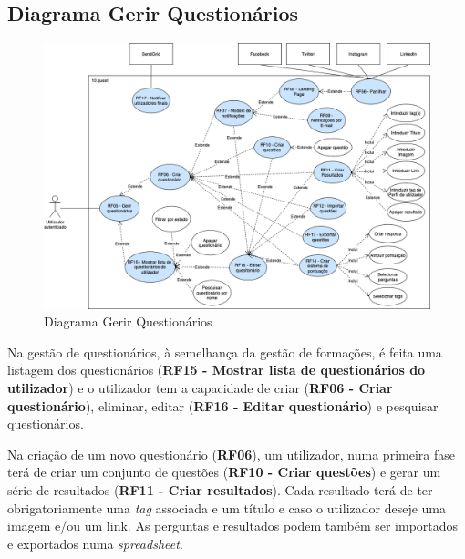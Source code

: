 \subsection{Diagrama Gerir Questionários}
\label{d:quests}
\begin{figure}[ht!]
	\begin{center}
		\includegraphics[width=1\textwidth]{img/rf/gerir-quest}
		\caption{Diagrama Gerir Questionários}
		\label{fig:rf-gerir-quest}
	\end{center}
\end{figure}

Na gestão de questionários, à semelhança da gestão de formações, é feita uma listagem dos questionários (\textbf{RF15 - Mostrar lista de questionários do utilizador}) e o utilizador tem a capacidade de criar (\textbf{RF06 - Criar questionário}), eliminar, editar (\textbf{RF16 - Editar questionário}) e pesquisar questionários.

Na criação de um novo questionário (\textbf{RF06}), um utilizador, numa primeira fase terá de criar um conjunto de questões (\textbf{RF10 - Criar questões}) e gerar um série de resultados (\textbf{RF11 - Criar resultados}). Cada resultado terá de ter obrigatoriamente uma \textit{tag} associada e um título e caso o utilizador deseje uma imagem e/ou um link. As perguntas e resultados podem também ser importados e exportados numa \textit{spreadsheet}.

